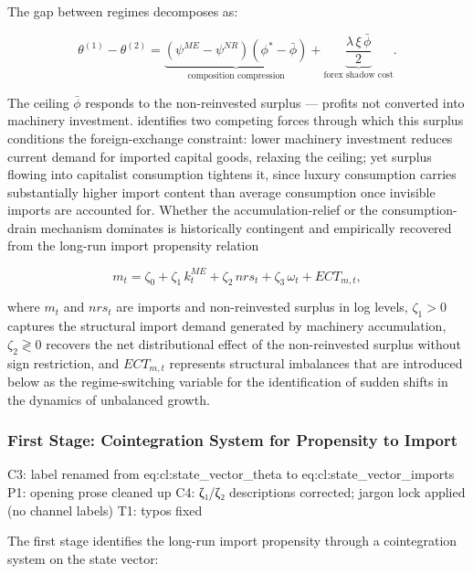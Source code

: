 \documentclass[11pt,a4paper]{article}
\begin{document}
{The gap between regimes decomposes as:

\begin{equation}
	\theta^{(1)}-\theta^{(2)}
	=
	\underbrace{
		(\psi^{ME}-\psi^{NR})(\phi^*-\bar{\phi})
	}_{\text{composition compression}}
	+
	\underbrace{
		\frac{\lambda\,\xi\,\bar{\phi}}{2}
	}_{\text{forex shadow cost}}.
	\label{eq:cl:theta_gap}
\end{equation}

The ceiling $\bar{\phi}$ responds to the non-reinvested surplus ---
profits not converted into machinery investment. \citet{Kaldor1959}
identifies two competing forces through which this surplus conditions
the foreign-exchange constraint: lower machinery investment reduces
current demand for imported capital goods, relaxing the ceiling; yet
surplus flowing into capitalist consumption tightens it, since luxury
consumption carries substantially higher import content than average
consumption once invisible imports are accounted for. Whether the
accumulation-relief or the consumption-drain mechanism dominates is
historically contingent and empirically recovered from the long-run
import propensity relation

\begin{equation}
	m_t
	=
	\zeta_0
	+
	\zeta_1\, k_t^{ME}
	+
	\zeta_2\, nrs_t
	+
	\zeta_3\, \omega_t
	+
	ECT_{m,t},
	\label{eq:cl:imports_coint}
\end{equation}

where $m_t$ and $nrs_t$ are imports and non-reinvested surplus in log
levels, $\zeta_1 > 0$ captures the structural import demand generated
by machinery accumulation, $\zeta_2 \gtrless 0$ recovers the net
distributional effect of the non-reinvested surplus without sign
restriction, and $ECT_{m,t}$ represents structural imbalances that are
introduced below as the regime-switching variable for the identification
of sudden shifts in the dynamics of unbalanced growth.

\subsubsection{First Stage: Cointegration System for Propensity to Import}
\label{subsec:chile_imports}

 C3: label renamed from eq:cl:state_vector_theta to eq:cl:state_vector_imports
 P1: opening prose cleaned up
 C4: ζ₁/ζ₂ descriptions corrected; jargon lock applied (no channel labels)
 T1: typos fixed

The first stage identifies the long-run import propensity through a
cointegration system on the state vector:

}
\end{document}
